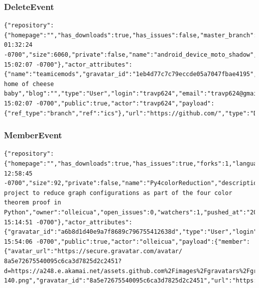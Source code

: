 \documentclass[a4paper,10pt]{article}
\begin{document}
\subsubsection{DeleteEvent}
\begin{lstlisting}
{"repository":{"homepage":"","has_downloads":true,"has_issues":false,"master_branch":"master","forks":0,"language":"Shell","fork":true,"has_wiki":true,"url":"https://github.com/travp624/android_device_moto_shadow","created_at":"2012/04/03 01:32:24 -0700","size":6060,"private":false,"name":"android_device_moto_shadow","description":"","owner":"travp624","open_issues":0,"watchers":1,"pushed_at":"2012/04/11 15:02:07 -0700"},"actor_attributes":{"name":"teamicemods","gravatar_id":"1eb4d77c7c79eccde05a7047fbae4195","location":"wisconsin home of cheese baby","blog":"","type":"User","login":"travp624","email":"travp624@gmail.com"},"created_at":"2012/04/11 15:02:07 -0700","public":true,"actor":"travp624","payload":{"ref_type":"branch","ref":"ics"},"url":"https://github.com/","type":"DeleteEvent"}
\end{lstlisting}






\subsubsection{MemberEvent}
\begin{lstlisting}
{"repository":{"homepage":"","has_downloads":true,"has_issues":true,"forks":1,"language":"Python","fork":false,"has_wiki":true,"url":"https://github.com/olleicua/Py4colorReduction","created_at":"2012/04/11 12:58:45 -0700","size":92,"private":false,"name":"Py4colorReduction","description":"A project to reduce graph configurations as part of the four color theorem proof in Python","owner":"olleicua","open_issues":0,"watchers":1,"pushed_at":"2012/04/11 15:14:51 -0700"},"actor_attributes":{"gravatar_id":"a6b8d1d40e9a7f8689c796755412638d","type":"User","login":"olleicua"},"created_at":"2012/04/11 15:54:06 -0700","public":true,"actor":"olleicua","payload":{"member":{"avatar_url":"https://secure.gravatar.com/avatar/
8a5e72675540095c6ca3d7825d2c2451?d=https://a248.e.akamai.net/assets.github.com%2Fimages%2Fgravatars%2Fgravatar-140.png","gravatar_id":"8a5e72675540095c6ca3d7825d2c2451","url":"https://api.github.com/users/emzeidan","id":1634836,"login":"emzeidan"},"action":"added"},"url":"https://github.com/olleicua/Py4colorReduction","type":"MemberEvent"}
\end{lstlisting}
\end{document}
